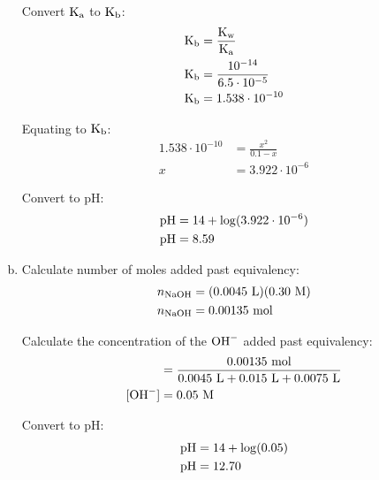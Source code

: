 \documentclass{article}
\begin{document}
\begin{enumerate}[(a)]
        Convert $\rm{K_a}$ to $\rm{K_b}$:
        \begin{align*}
            \rm{K_b} &= \frac{\rm{K_w}}{\rm{K_a}} \\
            \rm{K_b} &= \frac{10^{-14}}{6.5 \cdot 10^{-5}} \\
            \rm{K_b} &= 1.538 \cdot 10^{-10}
        \end{align*}
        
        Equating to $\rm{K_b}$:
        \begin{align*}
            1.538 \cdot 10^{-10} &= \frac{x^2}{0.1 - x} \\
            x &= 3.922 \cdot 10^{-6}
        \end{align*}

        Convert to pH:
        \begin{align*}
            \rm{pH} &= 14 + \log (3.922 \cdot 10^{-6}) \\
            \rm{pH} &= 8.59
        \end{align*}

    \item Calculate number of moles added past equivalency:
        \begin{align*}
            n_{\ce{NaOH}} &= (0.0045\ \si{L})(0.30\ \si{M}) \\
            n_{\ce{NaOH}} &= 0.00135\ \si{mol}
        \end{align*}

        Calculate the concentration of the $\ce{OH-}$ added past equivalency:
        \begin{align*}
            [\ce{OH-}] &= \frac{0.00135\ \si{mol}}{0.0045\ \si{L} + 0.015\
            \si{L} + 0.0075\ \si{L}} \\
            [\ce{OH-}] &= 0.05\ \si{M}
        \end{align*}

        Convert to pH:
        \begin{align*}
            \rm{pH} &= 14 + \log(0.05) \\
            \rm{pH} &= 12.70
        \end{align*}

\end{enumerate}
\end{document}
